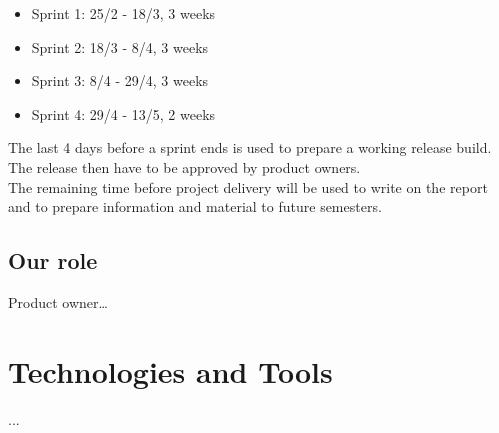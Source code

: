 \begin{itemize}
    \item Sprint 1: 25/2 - 18/3, 3 weeks
    \item Sprint 2: 18/3 - 8/4, 3 weeks
    \item Sprint 3: 8/4 - 29/4, 3 weeks
    \item Sprint 4: 29/4 - 13/5, 2 weeks
\end{itemize}

The last 4 days before a sprint ends is used to prepare a working release build. 
The release then have to be approved by product owners.
\\
The remaining time before project delivery will be used to write on the report and to prepare information and material to future semesters. 


\subsection{Our role}
Product owner…


\section{Technologies and Tools}
...


